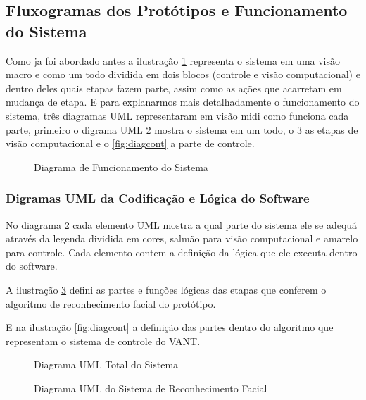 \subsection{Fluxogramas dos Protótipos e Funcionamento do Sistema}
 
 Como ja foi abordado antes a ilustração \ref{fig:pross} representa o sistema em uma visão macro e como um todo dividida em dois blocos (controle e visão computacional) e dentro deles quais etapas fazem parte, assim como as ações que acarretam em mudança de etapa. E para explanarmos mais detalhadamente o funcionamento do sistema, três diagramas UML representaram em visão midi como funciona cada parte, primeiro o digrama UML \ref{fig:diasist} mostra o sistema em um todo, o \ref{fig:diagvisao} as etapas de visão computacional e o \ref{fig:diagcont} a parte de controle.


\begin{figure}[H]
	\centering	
	\caption{Diagrama de Funcionamento do Sistema}
	\fontsize{9pt}{12pt}\selectfont
	\def\svgwidth{15cm}
	
	\label{fig:pross}
\end{figure}

\subsubsection{Digramas UML da Codificação e Lógica do Software}

No diagrama \ref{fig:diasist} cada elemento UML mostra a qual parte do sistema ele se adequá através da legenda dividida em cores, salmão para visão computacional e amarelo para controle. Cada elemento contem a definição da lógica que ele executa dentro do software.

A ilustração \ref{fig:diagvisao} defini as partes e funções lógicas das etapas que conferem o algoritmo de reconhecimento facial do protótipo.  

E na ilustração \ref{fig:diagcont} a definição das partes dentro do algoritmo que representam o sistema de controle do VANT. 

\begin{figure}[H]
	\centering	
	\caption{Diagrama UML Total do Sistema}
	\fontsize{9pt}{12pt}\selectfont
	\def\svgwidth{13cm}
	
	\label{fig:diasist}
\end{figure}

\begin{figure}[H]
	\centering	
	\caption{Diagrama UML do Sistema de Reconhecimento Facial}
	\fontsize{9pt}{12pt}\selectfont
	\def\svgwidth{10cm}
	
	\label{fig:diagvisao}
\end{figure}

